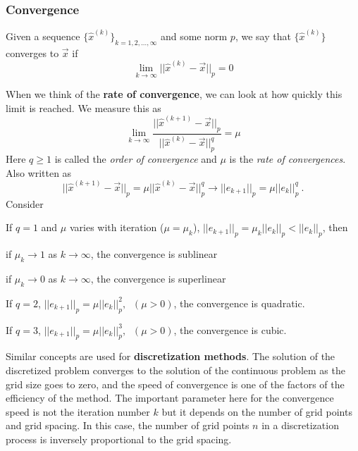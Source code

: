 \documentclass[12pt]{article}
\begin{document}
\subsubsection*{Convergence}
Given a sequence $\lbrace \hat{x}^{(k)} \rbrace_{k=1,2,\dots,\infty}$ and some norm $p$, we say that $\lbrace \hat{x}^{(k)} \rbrace$ converges to $\vec{x}$ if
%
\begin{equation}
\lim_{k \rightarrow \infty} ||\hat{x}^{(k)} - \vec{x}||_p = 0 \nonumber
\end{equation}

When we think of the \textbf{rate of convergence}, we can look at how quickly this limit is reached. We measure this as
\[ \lim_{k \rightarrow \infty} \frac{||\hat{x}^{(k+1)} - \vec{x}||_p}{||\hat{x}^{(k)} - \vec{x}||_p^q} = \mu\]
Here $q \geq 1$ is called the \textit{order of convergence} and $\mu$ is the \textit{rate of convergences}. Also written as
\[||\hat{x}^{(k+1)} - \vec{x}||_p = \mu ||\hat{x}^{(k)} - \vec{x}||_p^q \rightarrow ||e_{k+1}||_p = \mu||e_{k}||_p^q\:.
\]
Consider
\begin{compactitem}
\item If $q=1$ and $\mu$ varies with iteration ($\mu = \mu_k$),  $||e_{k+1}||_p =\mu_k || e_k ||_p < || e_k ||_p$, then
  \begin{compactitem}
  \item if $\mu_k \rightarrow 1$ as $k \rightarrow \infty$, the convergence is sublinear
  \item if $\mu_k \rightarrow 0$ as $k \rightarrow \infty$, the convergence is superlinear
  \end{compactitem}
\item If $q=2$,  $|| e_{k+1} ||_p = \mu || e_k ||_p^2,\;\;(\mu>0)$, the convergence is quadratic.
\item If $q=3$,  $ || e_{k+1} ||_p = \mu || e_k ||_p^3,\;\;(\mu>0)$, the convergence is cubic.
\end{compactitem}

Similar concepts are used for \textbf{discretization methods}. The solution of the discretized problem converges to the solution of the continuous problem as the grid size goes to zero, and the speed of convergence is one of the factors of the efficiency of the method. The important parameter here for the convergence speed is not the iteration number $k$ but it depends on the number of grid points and grid spacing. In this case, the number of grid points $n$ in a discretization process is inversely proportional to the grid spacing. 
\end{document}
